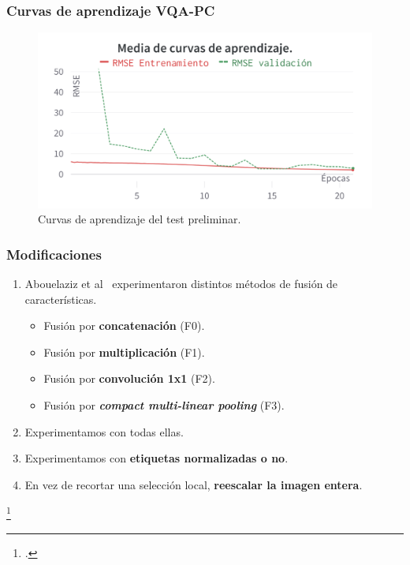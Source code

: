 \begin{frame}
  \frametitle{Curvas de aprendizaje VQA-PC}
  \vspace{-.5cm}
\begin{figure}[htp]
  \centering
    \includegraphics[width=.75\textwidth]{imagenes/chapter4/PreTestCurves.png}
  \caption[Curvas de aprendizaje del test preliminar.]{
    Curvas de aprendizaje del test preliminar. 
  } 
\label{fig:PreTestCurves}
\end{figure}
\end{frame}

\begin{frame}
  \frametitle{Modificaciones}
  \begin{enumerate}
    \item Abouelaziz et al\footnotemark~ experimentaron \alert{distintos métodos de fusión de características}.
      \begin{itemize}
        \item Fusión por \textbf{concatenación} (F0).
        \item Fusión por \textbf{multiplicación} (F1). 
        \item Fusión por \textbf{convolución 1x1} (F2).
        \item Fusión por \textbf{\emph{compact multi-linear pooling}} (F3).
      \end{itemize}
    \item Experimentamos con todas ellas.
    \item Experimentamos con \textbf{etiquetas normalizadas o no}.
    \item En vez de recortar una selección local, \textbf{reescalar la imagen entera}.
  \end{enumerate}
  \footcitetext{EnsemblePCQA}
\end{frame}

